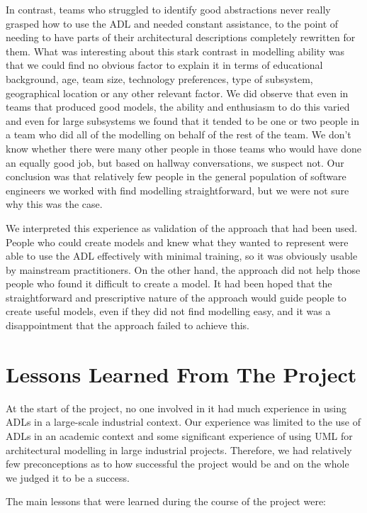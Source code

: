   In contrast, teams who struggled to identify good abstractions never really grasped how to use the ADL and needed constant assistance, to the point of needing to have parts of their architectural descriptions completely rewritten for them.   What was interesting about this stark contrast in modelling ability was that we could find no obvious factor to explain it in terms of educational background, age, team size, technology preferences, type of subsystem, geographical location or any other relevant factor.  We did observe that even in teams that produced good models, the ability and enthusiasm to do this varied and even for large subsystems we found that it tended to be one or two people in a team who did all of the modelling on behalf of the rest of the team.  We don't know whether there were many other people in those teams who would have done an equally good job, but based on hallway conversations, we suspect not.  Our conclusion was that relatively few people in the general population of software engineers we worked with find modelling straightforward, but we were not sure why this was the case.

  We interpreted this experience as validation of the approach that had been used.  People who could create models and knew what they wanted to represent were able to use the ADL effectively with minimal training, so it was obviously usable by mainstream practitioners.  On the other hand, the approach did not help those people who found it difficult to create a model.  It had been hoped that the straightforward and prescriptive nature of the approach would guide people to create useful models, even if they did not find modelling easy, and it was a disappointment that the approach failed to achieve this.

  \section{Lessons Learned From The Project}

  At the start of the project, no one involved in it had much experience in using ADLs in a large-scale industrial context.  Our experience was limited to the use of ADLs in an academic context and some significant experience of using UML for architectural modelling in large industrial projects.  Therefore, we had relatively few preconceptions as to how successful the project would be and on the whole we judged it to be a success.

  The main lessons that were learned during the course of the project were:
  
